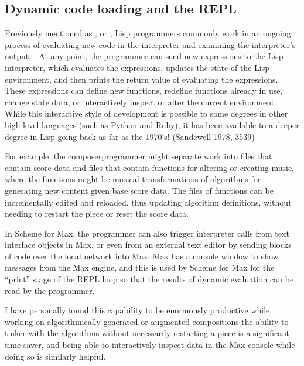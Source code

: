 \documentclass[letterpaper,10pt,english]{sphinxmanual}
\begin{document}
\subsection{Dynamic code loading and the REPL}
\label{\detokenize{design:dynamic-code-loading-and-the-repl}}
\sphinxAtStartPar
Previously mentioned as , or , Lisp programmers commonly work in an ongoing process
of evaluating new code in the interpreter and examining the interpreter’s output, .
At any point, the programmer can send new expressions to the Lisp interpreter, which evaluates the expressions, updates
the state of the Lisp environment, and then prints the return value of evaluating the expressions.
These expressions can define new functions, redefine functions already in use, change state data, or
interactively inspect or alter the current environment. While this interactive style of development is possible
to some degrees in other high level languages (such as Python and Ruby), it has been available to a deeper degree in Lisp going
back as far as the 1970’s! (Sandewell 1978, 35\sphinxhyphen{}39)

\sphinxAtStartPar
For example, the composer\sphinxhyphen{}programmer might separate work into files that contain score data and files
that contain functions for altering or creating music, where the functions might be musical transformations of
algorithms for generating new content given base score data.
The files of functions can be incrementally edited and reloaded, thus updating algorithm definitions, without needing
to restart the piece or reset the score data.

\sphinxAtStartPar
In Scheme for Max, the programmer can also trigger
interpreter calls from text interface objects in Max, or even from an external text editor
by sending blocks of code over the local network into Max.
Max has a console window to show messages from the Max engine, and this is used by Scheme for Max
for the “print” stage of the REPL loop so that the results of dynamic evaluation can be read by the programmer.

\sphinxAtStartPar
I have personally found this capability to be enormously productive while working on
algorithmically generated or augmented compositions \sphinxhyphen{} the ability to tinker with the algorithms
without necessarily restarting a piece is a significant time saver, and being able to interactively
inspect data in the Max console while doing so is similarly helpful.
\end{document}
